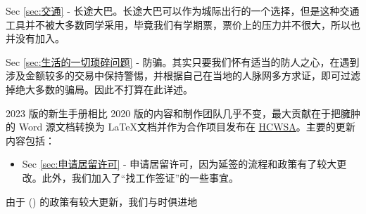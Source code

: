   Sec \ref{sec:交通} - 长途大巴。长途大巴可以作为城际出行的一个选择，但是这种交通工具并不被大多数同学采用，毕竟我们有学期票，票价上的压力并不很大，所以也并没有加入。

  Sec \ref{sec:生活的一切琐碎问题} - 防骗。其实只要我们怀有适当的防人之心，在遇到涉及金额较多的交易中保持警惕，并根据自己在当地的人脉网多方求证，即可过滤掉绝大多数的骗局。因此不打算在此详述。

  2023 版的新生手册相比 2020 版的内容和制作团队几乎不变，最大贡献在于把臃肿的 Word 源文档转换为 \LaTeX 文档并作为合作项目发布在 \href{https://github.com/OChicken/HCWSA}{HCWSA}。主要的更新内容包括：

  \begin{itemize}
    \item Sec \ref{sec:申请居留许可} - 申请居留许可，因为延签的流程和政策有了较大更改。此外，我们加入了``找工作签证''的一些事宜。
    
  \end{itemize}

  由于 () 的政策有较大更新，我们与时俱进地
